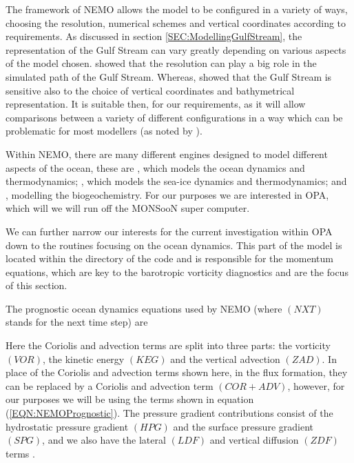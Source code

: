 \documentclass[..\report.tex]{subfiles}
\begin{document}
The framework of \gls{NEMO} allows the model to be configured in a variety of ways, choosing the resolution, numerical schemes and vertical coordinates according to requirements. As discussed in section \ref{SEC:ModellingGulfStream}, the representation of the Gulf Stream can vary greatly depending on various aspects of the model chosen. \citet{Scaife2011a} showed that the resolution can play a big role in the simulated path of the Gulf Stream. Whereas, \citet{Ezer2016b} showed that the Gulf Stream is sensitive also to the choice of vertical coordinates and bathymetrical representation. It is suitable then, for our requirements, as it will allow comparisons between a variety of different configurations in a way which can be problematic for most modellers (as noted by \citet{Ezer2016b}).\par

Within \gls{NEMO}, there are many different engines designed to model different aspects of the ocean, these are , which models the ocean dynamics and thermodynamics; , which models the sea-ice dynamics and thermodynamics; and , modelling the biogeochemistry. For our purposes we are interested in \gls{OPA}, which will we will run off the MONSooN super computer.\par
We can further narrow our interests for the current investigation within \gls{OPA} down to the routines focusing on the ocean dynamics. This part of the model is located within the  directory of the code and is responsible for the momentum equations, which are key to the barotropic vorticity diagnostics and are the focus of this section. \par

The prognostic ocean dynamics equations used by \gls{NEMO} (where $(NXT)$ stands for the next time step) are 


Here the Coriolis and advection terms are split into three parts: the vorticity $(VOR)$, the kinetic energy $(KEG)$ and the vertical advection $(ZAD)$.
In place of the Coriolis and advection terms shown here, in the flux formation, they can be replaced by a Coriolis and advection term $(COR + ADV)$, however, for our purposes we will be using the terms shown in equation (\ref{EQN:NEMOPrognostic}). The pressure gradient contributions consist of the hydrostatic pressure gradient $(HPG)$ and the surface pressure gradient $(SPG)$, and we also have the lateral $(LDF)$ and vertical diffusion $(ZDF)$ terms \citep{Madec2011}.
\end{document}
